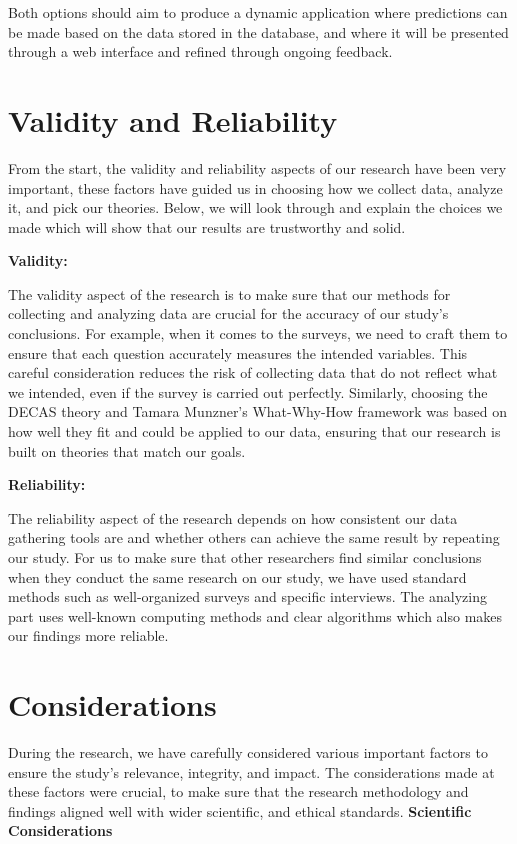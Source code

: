 Both options should aim to produce a dynamic application where predictions can be made based on the data stored in the database, and where it will be presented through a web interface and refined through ongoing feedback.

\section{Validity and Reliability}
From the start, the validity and reliability aspects of our research have been very important, these factors have guided us in choosing how we collect data, analyze it, and pick our theories. Below, we will look through and explain the choices we made which will show that our results are trustworthy and solid.  


\textbf{Validity:}


The validity aspect of the research is to make sure that our methods for collecting and analyzing data are crucial for the accuracy of our study’s conclusions.  For example, when it comes to the surveys, we need to craft them to ensure that each question accurately measures the intended variables. This careful consideration reduces the risk of collecting data that do not reflect what we intended, even if the survey is carried out perfectly. Similarly, choosing the DECAS theory and Tamara Munzner's What-Why-How framework was based on how well they fit and could be applied to our data, ensuring that our research is built on theories that match our goals.


\textbf{Reliability:}


The reliability aspect of the research depends on how consistent our data gathering tools are and whether others can achieve the same result by repeating our study. For us to make sure that other researchers find similar conclusions when they conduct the same research on our study, we have used standard methods such as well-organized surveys and specific interviews. The analyzing part uses well-known computing methods and clear algorithms which also makes our findings more reliable.
\section{Considerations}

During the research, we have carefully considered various important factors to ensure the study’s relevance, integrity, and impact. The considerations made at these factors were crucial, to make sure that the research methodology and findings aligned well with wider scientific, and ethical standards. 
\textbf{Scientific Considerations}

